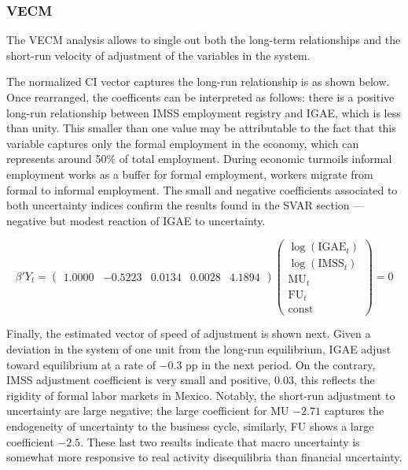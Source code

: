 \documentclass[12pt]{article}
\begin{document}



\subsubsection*{VECM}
The VECM analysis allows to single out both the long-term relationships and the short-run velocity of adjustment of the variables in the system. 


The normalized CI vector captures the long-run relationship is as shown below. Once rearranged, the coefficents can be interpreted as follows: there is a positive long-run relationship between IMSS employment registry and IGAE, which is less than unity. This smaller than one value may be attributable to the fact that this variable captures only  the formal employment in the economy, which can represents around 50\% of total employment. During economic turmoils informal employment works as a buffer for formal employment, workers migrate from formal to informal employment. The small and negative coefficients associated to both uncertainty indices confirm the results found in the SVAR section ---negative but modest reaction of IGAE to uncertainty. 

\[
\beta' Y_t = 
\begin{pmatrix}
1.0000 & -0.5223 & 0.0134 & 0.0028 & 4.1894
\end{pmatrix}
\begin{pmatrix}
\log(\text{IGAE}_t) \\
\log(\text{IMSS}_t) \\
\text{MU}_t \\
\text{FU}_t \\
\text{const}
\end{pmatrix}
= 0
\]



Finally, the estimated vector of speed of adjustment is shown next. Given a deviation in the system of one unit from the long-run equilibrium, IGAE adjust toward equilibrium  at a rate of $-0.3$ pp in the next period. On the contrary, IMSS adjustment coefficient is very small and positive,  $0.03$, this reflects the rigidity of formal labor markets in Mexico. Notably, the short-run adjustment to uncertainty are large negative; the large coefficient for MU $-2.71$  captures the endogeneity of uncertainty to the business cycle, similarly, FU shows a large coefficient $-2.5$. These last two results indicate that macro uncertainty is somewhat more responsive to real activity disequilibria than financial uncertainty.
\end{document}
